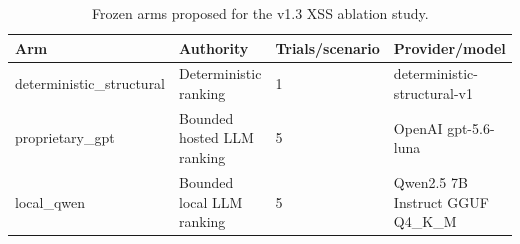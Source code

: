 \begin{table}[ht]
\centering
\caption{Frozen arms proposed for the v1.3 XSS ablation study.}
\label{tab:xss-v13-ablation-arms}
\begin{tabular}{llll}
\hline
Arm & Authority & Trials/scenario & Provider/model \\
\hline
deterministic\_structural & Deterministic ranking & 1 & deterministic-structural-v1 \\
proprietary\_gpt & Bounded hosted LLM ranking & 5 & OpenAI gpt-5.6-luna \\
local\_qwen & Bounded local LLM ranking & 5 & Qwen2.5 7B Instruct GGUF Q4\_K\_M \\
\hline
\end{tabular}
\end{table}
